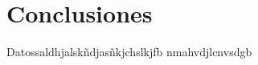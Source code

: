 \documentclass[../informe.tex]{subfiles}
\begin{document}
\section{Conclusiones}
\label{sec:conclusiones}
Datossaldhjalskñdjasñkjchslkjfb nmahvdjlcnvsdgb
\end{document}
